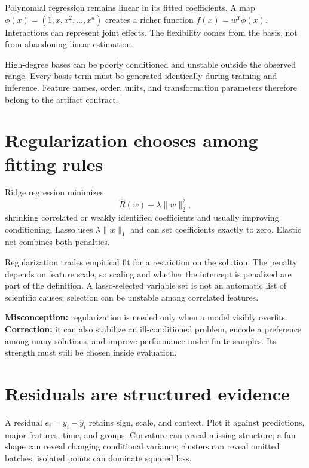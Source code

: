 Polynomial regression remains linear in its fitted coefficients. A map
$\phi(x)=(1,x,x^2,\ldots,x^d)$ creates a richer function
$f(x)=w^T\phi(x)$. Interactions can represent joint effects. The flexibility
comes from the basis, not from abandoning linear estimation.

High-degree bases can be poorly conditioned and unstable outside the observed
range. Every basis term must be generated identically during training and
inference. Feature names, order, units, and transformation parameters therefore
belong to the artifact contract.

\section{Regularization chooses among fitting rules}

Ridge regression minimizes
\[
\widehat R(w)+\lambda\lVert w\rVert_2^2,
\]
shrinking correlated or weakly identified coefficients and usually improving
conditioning. Lasso uses $\lambda\lVert w\rVert_1$ and can set coefficients
exactly to zero. Elastic net combines both penalties.

Regularization trades empirical fit for a restriction on the solution. The
penalty depends on feature scale, so scaling and whether the intercept is
penalized are part of the definition. A lasso-selected variable set is not an
automatic list of scientific causes; selection can be unstable among correlated
features.

\begin{misconceptionbox}
\textbf{Misconception:} regularization is needed only when a model visibly
overfits. \textbf{Correction:} it can also stabilize an ill-conditioned
problem, encode a preference among many solutions, and improve performance
under finite samples. Its strength must still be chosen inside evaluation.
\end{misconceptionbox}

\section{Residuals are structured evidence}

A residual $e_i=y_i-\widehat y_i$ retains sign, scale, and context. Plot it
against predictions, major features, time, and groups. Curvature can reveal
missing structure; a fan shape can reveal changing conditional variance;
clusters can reveal omitted batches; isolated points can dominate squared loss.

